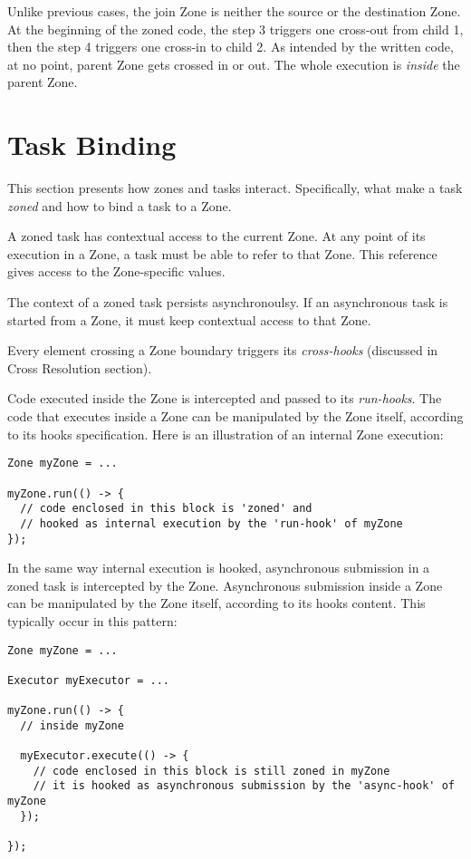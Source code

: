 Unlike previous cases, the join Zone is neither the source or the destination Zone. At the beginning of the zoned code, the step 3 triggers one cross-out from child 1, then the step 4 triggers one cross-in to child 2. As intended by the written code, at no point, parent Zone gets crossed in or out. The whole execution is \emph{inside} the parent Zone.

\section{Task Binding}

This section presents how zones and tasks interact. Specifically, what make a task \emph{zoned} and how to bind a task to a Zone.

A zoned task has contextual access to the current Zone. At any point of its execution in a Zone, a task must be able to refer to that Zone. This reference gives
access to the Zone-specific values.

The context of a zoned task persists asynchronoulsy. If an asynchronous task is started from a Zone, it must keep contextual access to that Zone.

Every element crossing a Zone boundary triggers its \emph{cross-hooks} (discussed in Cross Resolution section).

Code executed inside the Zone is intercepted and passed to its \emph{run-hooks}. The code that executes inside a Zone can be manipulated by the Zone itself, according to its hooks specification. Here is an illustration of an internal Zone execution:

\begin{lstlisting}
Zone myZone = ...

myZone.run(() -> {
  // code enclosed in this block is 'zoned' and
  // hooked as internal execution by the 'run-hook' of myZone
});
\end{lstlisting}

In the same way internal execution is hooked, asynchronous submission in a zoned task is intercepted by the Zone.
Asynchronous submission inside a Zone can be manipulated by the Zone itself, according to its hooks content. This typically occur in this pattern:

\begin{lstlisting}
Zone myZone = ...

Executor myExecutor = ...

myZone.run(() -> {
  // inside myZone

  myExecutor.execute(() -> {
    // code enclosed in this block is still zoned in myZone
    // it is hooked as asynchronous submission by the 'async-hook' of myZone
  });
  
});
\end{lstlisting}

